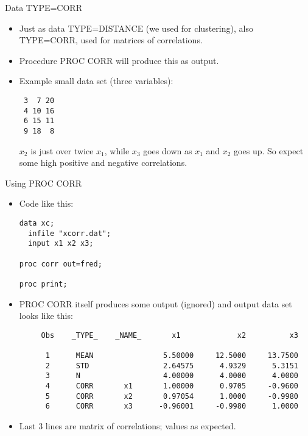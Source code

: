 \documentclass[pdf]{prosper}
\begin{document}
\begin{slide}{Data TYPE=CORR}

  \begin{itemize}
  \item Just as data TYPE=DISTANCE (we used for clustering), also TYPE=CORR, used for matrices of correlations.
  \item Procedure PROC CORR will produce this as output.
  \item Example small data set (three variables):
\begin{verbatim}
 3  7 20
 4 10 16
 6 15 11
 9 18  8
\end{verbatim}
    $x_2$ is just over twice $x_1$, while $x_3$ goes down as $x_1$ and $x_2$ goes up. So expect some high positive and negative correlations.
  \end{itemize}
  
\end{slide}

\begin{slide}{Using PROC CORR}

  \begin{itemize}
  \item Code like this:

\begin{verbatim}
data xc;
  infile "xcorr.dat";
  input x1 x2 x3;

proc corr out=fred;

proc print;
\end{verbatim}
  \item PROC CORR itself produces some output (ignored) and output data set looks like this:

{\scriptsize
\begin{verbatim}
     Obs    _TYPE_    _NAME_       x1             x2          x3

      1      MEAN                5.50000     12.5000     13.7500
      2      STD                 2.64575      4.9329      5.3151
      3      N                   4.00000      4.0000      4.0000
      4      CORR       x1       1.00000      0.9705     -0.9600
      5      CORR       x2       0.97054      1.0000     -0.9980
      6      CORR       x3      -0.96001     -0.9980      1.0000
\end{verbatim}
}
\item Last 3 lines are matrix of correlations; values as expected.
  \end{itemize}
  
\end{slide}
\end{document}
